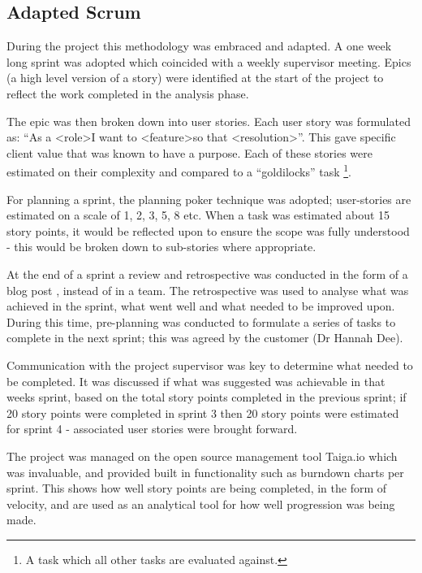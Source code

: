 \subsection{Adapted Scrum}
During the project this methodology was embraced and adapted. A one week long sprint was adopted which coincided with a weekly supervisor meeting. Epics (a high level version of a story) were identified at the start of the project to reflect the work completed in the analysis phase.

The epic was then broken down into user stories. Each user story was formulated as: ``As a \textless role\textgreater I want to \textless feature\textgreater so that \textless resolution\textgreater''. This gave specific client value that was known to have a purpose. Each of these stories were estimated on their complexity and compared to a ``goldilocks'' task \footnote{A task which all other tasks are evaluated against.}.

For planning a sprint, the planning poker \cite{citeulike:14014357} technique was adopted; user-stories are estimated on a scale of 1, 2, 3, 5, 8 etc. When a task was estimated about 15 story points, it would be reflected upon to ensure the scope was fully understood - this would be broken down to sub-stories where appropriate.

At the end of a sprint a review and retrospective was conducted in the form of a blog post \cite{citeulike:14014367}, instead of in a team. The retrospective was used to analyse what was achieved in the sprint, what went well and what needed to be improved upon. During this time, pre-planning was conducted to formulate a series of tasks to complete in the next sprint; this was agreed by the customer (Dr Hannah Dee).

Communication with the project supervisor was key to determine what needed to be completed. It was discussed if what was suggested was achievable in that weeks sprint, based on the total story points completed in the previous sprint; if 20 story points were completed in sprint 3 then 20 story points were estimated for sprint 4 - associated user stories were brought forward.

The project was managed on the open source management tool Taiga.io \cite{citeulike:14014360} which was invaluable, and provided built in functionality such as burndown charts per sprint. This shows how well story points are being completed, in the form of velocity, and are used as an analytical tool for how well progression was being made.

